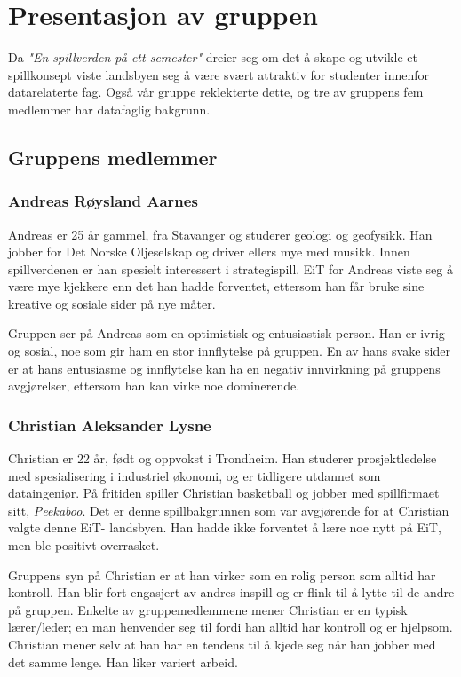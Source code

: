 \section{Presentasjon av gruppen}
Da \emph{"En spillverden på ett semester"} dreier seg om det å skape og utvikle et spillkonsept viste landsbyen seg å være svært attraktiv for studenter innenfor datarelaterte fag. Også vår gruppe reklekterte dette, og tre av gruppens fem medlemmer har datafaglig bakgrunn.

\subsection{Gruppens medlemmer}
	\subsubsection{Andreas Røysland Aarnes}
	Andreas er 25 år gammel, fra Stavanger og studerer geologi og geofysikk. Han jobber for Det Norske Oljeselskap og driver ellers mye med musikk. Innen spillverdenen er han spesielt interessert i strategispill. EiT for Andreas viste seg å være mye kjekkere enn det han hadde forventet, ettersom han får bruke sine kreative og sosiale sider på nye måter. 

	Gruppen ser på Andreas som en optimistisk og entusiastisk person. Han er ivrig og sosial, noe som gir ham en stor innflytelse på gruppen. En av hans svake sider er at hans entusiasme og innflytelse kan ha en negativ innvirkning på gruppens avgjørelser, ettersom han kan virke noe dominerende.

	\subsubsection{Christian Aleksander Lysne}
	Christian er 22 år, født og oppvokst i Trondheim. Han studerer prosjektledelse med spesialisering i industriel økonomi, og er tidligere utdannet som dataingeniør. På fritiden spiller Christian basketball og jobber med spillfirmaet sitt, \emph{Peekaboo}. Det er denne spillbakgrunnen som var avgjørende for at Christian valgte denne EiT- landsbyen. Han hadde ikke forventet å lære noe nytt på EiT, men ble positivt overrasket.   

	Gruppens syn på Christian er at han virker som en rolig person som alltid har kontroll. Han blir fort engasjert av andres inspill og er flink til å lytte til de andre på gruppen. Enkelte av gruppemedlemmene mener Christian er en typisk lærer/leder; en man henvender seg til fordi han alltid har kontroll og er hjelpsom. Christian mener selv at han har en tendens til å kjede seg når han jobber med det samme lenge. Han liker variert arbeid.

